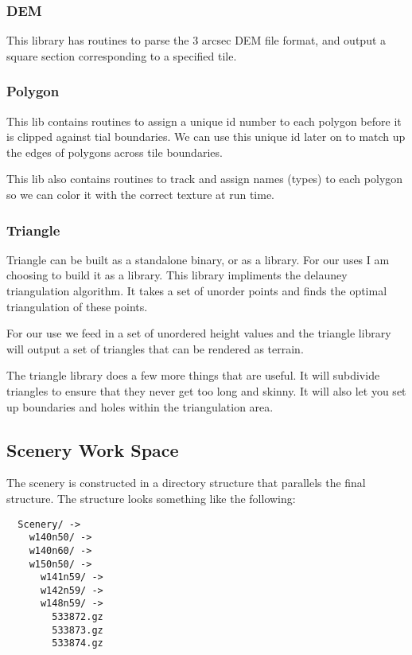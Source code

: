 \documentclass[12pt]{article}
\begin{document}
\subsubsection{DEM}

This library has routines to parse the 3 arcsec DEM file format, and
output a square section corresponding to a specified tile.

\subsubsection{Polygon}

This lib contains routines to assign a unique id number to each
polygon before it is clipped against tial boundaries.  We can use this
unique id later on to match up the edges of polygons across tile
boundaries.

This lib also contains routines to track and assign names (types) to
each polygon so we can color it with the correct texture at run time.

\subsubsection{Triangle}

Triangle can be built as a standalone binary, or as a library.  For
our uses I am choosing to build it as a library.  This library
impliments the delauney triangulation algorithm.  It takes a set of
unorder points and finds the optimal triangulation of these points.

For our use we feed in a set of unordered height values and the
triangle library will output a set of triangles that can be rendered
as terrain.

The triangle library does a few more things that are useful.  It will
subdivide triangles to ensure that they never get too long and
skinny.  It will also let you set up boundaries and holes within the
triangulation area.

\subsection{Scenery Work Space}

The scenery is constructed in a directory structure that parallels the
final structure.  The structure looks something like the following:

\begin{verbatim}
  Scenery/ ->
    w140n50/ ->
    w140n60/ ->
    w150n50/ ->
      w141n59/ ->
      w142n59/ ->
      w148n59/ ->
        533872.gz
        533873.gz
        533874.gz
\end{verbatim}
\end{document}
